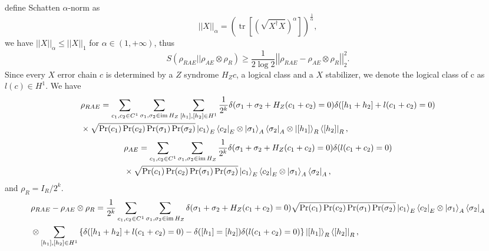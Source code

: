 \documentclass[twoside,english,aps,showpacs,pra,superscriptaddress]{revtex4-2}
\DeclareMathOperator{\tr}{tr}
\DeclareMathOperator{\im}{im}
\newcommand{\norm}[1]{\left| \left| {#1}\right|\right|}
\begin{document}
define Schatten $\alpha$-norm as 
\begin{equation}
    \norm{X}_{\alpha} = \left(\tr \left[\left(\sqrt{X^\dagger X}\right)^\alpha\right]\right)^{\frac{1}{\alpha}},
\end{equation}
we have $\norm{X}_{\alpha} \leq \norm{X}_{1}$ for $\alpha \in (1,+\infty)$, thus
\begin{equation}
    S(\rho_{RAE}||\rho_{AE} \otimes \rho_{R})\geq \frac{1}{2\log 2} \norm{\rho_{RAE} - \rho_{AE} \otimes \rho_{R}}^2_2.
\end{equation}
Since every $X$ error chain $c$ is determined by a $Z$ syndrome $H_Z c$, a logical class and a $X$ stabilizer, we denote the logical class of c as $l(c) \in H^1$.
We have
\begin{equation}
    \begin{aligned}
        &\rho_{RAE} = \sum_{c_1,c_2 \in C^1} \sum_{\sigma_1,\sigma_2 \in \im H_Z} \sum_{[h_1],[h_2] \in H^1}\frac{1}{2^k} \delta(\sigma_1 + \sigma_2 + H_Z(c_1+c_2)= 0)\delta([h_1+h_2] + l(c_1+c_2) = 0)\\
        &\times \sqrt{\Pr(c_1) \Pr(c_2) \Pr(\sigma_1) \Pr(\sigma_2)} \ket{c_1}_E\bra{c_2}_E\otimes \ket{\sigma_1}_A\bra{\sigma_2}_A\otimes \ket{[h_1]}_R\bra{[h_2]}_R,
    \end{aligned}
\end{equation}
\begin{equation}
    \begin{aligned}
        &\rho_{AE} = \sum_{c_1,c_2 \in C^1} \sum_{\sigma_1,\sigma_2 \in \im H_Z} \frac{1}{2^k} \delta(\sigma_1 + \sigma_2 + H_Z(c_1+c_2)= 0)\delta( l(c_1+c_2) = 0)\\
        &\times \sqrt{\Pr(c_1) \Pr(c_2) \Pr(\sigma_1) \Pr(\sigma_2)} \ket{c_1}_E\bra{c_2}_E\otimes \ket{\sigma_1}_A\bra{\sigma_2}_A,
    \end{aligned}
\end{equation}
and $\rho_R = I_R/2^k$.
\begin{equation}
    \begin{aligned}
        &\rho_{RAE}- \rho_{AE} \otimes \rho_{R} = \frac{1}{2^k}\sum_{c_1,c_2 \in C^1} \sum_{\sigma_1,\sigma_2 \in \im H_Z}  \delta(\sigma_1 + \sigma_2 + H_Z(c_1+c_2)= 0)\sqrt{\Pr(c_1) \Pr(c_2) \Pr(\sigma_1) \Pr(\sigma_2)} \ket{c_1}_E\bra{c_2}_E\otimes \ket{\sigma_1}_A\bra{\sigma_2}_A\\
        &\otimes\sum_{[h_1],[h_2] \in H^1}\left\{ \delta([h_1+h_2] + l(c_1+c_2) = 0)- \delta([h_1]=[h_2])\delta( l(c_1+c_2) = 0)\right\}\ket{[h_1]}_R\bra{[h_2]}_R,
    \end{aligned}
\end{equation}
\end{document}
